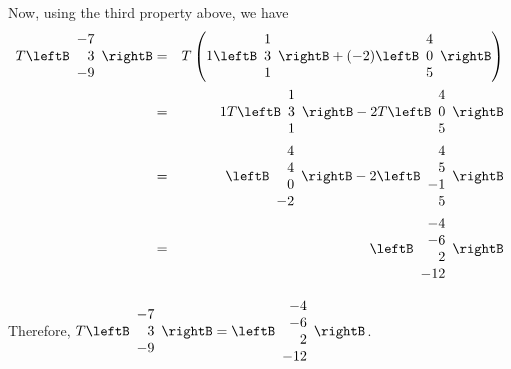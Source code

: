 \begin{solution}
Now, using the third property above, we have 
\begin{eqnarray*}
T \leftB \begin{array}{r}
-7 \\
3 \\
-9
\end{array} \rightB
&=&
T \left(
1
\leftB \begin{array}{r}
1 \\
3 \\
1
\end{array} \rightB
+
(-2)
\leftB \begin{array}{r}
4 \\
0 \\
5
\end{array} \rightB
\right) \\
&=& 
1T 
\leftB \begin{array}{r}
1 \\
3 \\
1
\end{array} \rightB
-2T
\leftB \begin{array}{r}
4 \\
0 \\
5
\end{array} \rightB
\\
&=&
\leftB \begin{array}{r}
4 \\
4 \\
0 \\
-2
\end{array} \rightB
-2
\leftB \begin{array}{r}
4 \\
5 \\
-1 \\
5
\end{array} \rightB
\\
&=& 
\leftB
\begin{array}{r}
-4 \\
-6 \\
2 \\
-12
\end{array}
\rightB
\end{eqnarray*}

Therefore, $T \leftB \begin{array}{r}
-7 \\
3 \\
-9
\end{array}
\rightB
=
\leftB
\begin{array}{r}
-4 \\
-6 \\
2 \\
-12
\end{array}
\rightB
$.
\end{solution}

